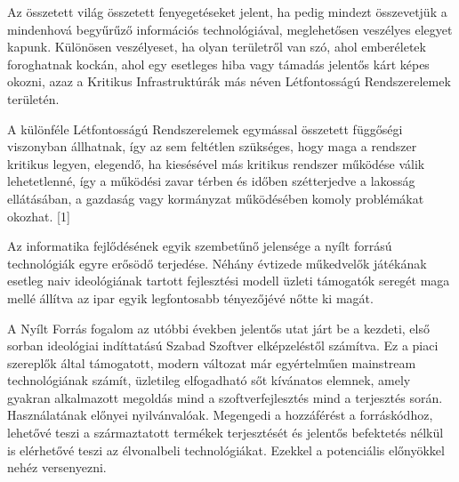 \documentclass[12pt,magyar,a4paper,oneside]{scrreprt}
\begin{document}
Az összetett világ összetett fenyegetéseket jelent, ha pedig mindezt
összevetjük a mindenhová begyűrűző információs technológiával,
meglehetősen veszélyes elegyet kapunk. Különösen veszélyeset, ha olyan
területről van szó, ahol emberéletek foroghatnak kockán, ahol egy
esetleges hiba vagy támadás jelentős kárt képes okozni, azaz a Kritikus
Infrastruktúrák más néven Létfontosságú Rendszerelemek területén.

A különféle Létfontosságú Rendszerelemek egymással összetett függőségi
viszonyban állhatnak, így az sem feltétlen szükséges, hogy maga a
rendszer kritikus legyen, elegendő, ha kiesésével más kritikus rendszer
működése válik lehetetlenné, így a működési zavar térben és időben
szétterjedve a lakosság ellátásában, a gazdaság vagy kormányzat
működésében komoly problémákat okozhat. {[}1{]}

Az informatika fejlődésének egyik szembetűnő jelensége a nyílt forrású
technológiák egyre erősödő terjedése. Néhány évtizede műkedvelők
játékának esetleg naiv ideológiának tartott fejlesztési modell üzleti
támogatók seregét maga mellé állítva az ipar egyik legfontosabb
tényezőjévé nőtte ki magát.

A Nyílt Forrás fogalom az utóbbi években jelentős utat járt be a
kezdeti, első sorban ideológiai indíttatású Szabad Szoftver
elképzeléstől számítva. Ez a piaci szereplők által támogatott, modern
változat már egyértelműen mainstream technológiának számít, üzletileg
elfogadható sőt kívánatos elemnek, amely gyakran alkalmazott megoldás
mind a szoftverfejlesztés mind a terjesztés során. Használatának előnyei
nyilvánvalóak. Megengedi a hozzáférést a forráskódhoz, lehetővé teszi a
származtatott termékek terjesztését és jelentős befektetés nélkül is
elérhetővé teszi az élvonalbeli technológiákat. Ezekkel a potenciális
előnyökkel nehéz versenyezni.
\end{document}
